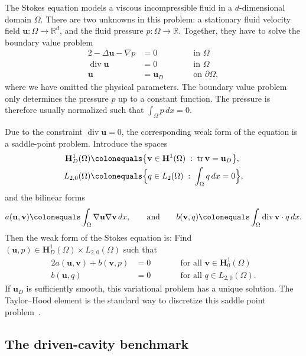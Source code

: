 \documentclass[a4paper,10pt,headings=normal,bibliography=totoc]{scrartcl}
\newcommand{\R}{\mathbb{R}}
\renewcommand{\div}{\operatorname{div}}
\begin{document}
The Stokes equation models a viscous incompressible
fluid in a $d$-dimensional domain $\Omega$.  There are two unknowns in this problem: a stationary
fluid velocity field $\mathbf{u} : \Omega \to \R^d$, and the fluid pressure $p : \Omega \to \R$.
Together, they have to solve the boundary value problem
\begin{alignat*}{2}
 -\Delta \mathbf{u} - \nabla p & = 0  & \qquad & \text{in $\Omega$} \\
 \div \mathbf{u} & = 0                &        & \text{in $\Omega$} \\
                    \mathbf{u} & = \mathbf{u}_D  &        & \text{on $\partial \Omega$},
\end{alignat*}
where we have omitted the physical parameters.  The boundary value problem only determines the
pressure $p$ up to a constant function.  The pressure is therefore usually normalized such
that $\int_\Omega p\,dx = 0$.

Due to the constraint $\div \mathbf{u} = 0$, the corresponding weak form of the equation is a saddle-point problem.
Introduce the spaces
\begin{align*}
 \mathbf{H}^1_D(\Omega)
      & \colonequals
      \big\{ \mathbf{v} \in \mathbf{H}^1(\Omega) \; :\; \operatorname{tr}{\mathbf{v}} = \mathbf{u}_D \big\}, \\
 L_{2,0}(\Omega) & \colonequals  \Big\{ q \in L_2(\Omega) \; :\; \int_\Omega q\,dx = 0 \Big\},
\end{align*}
and the bilinear forms
\begin{equation*}
 a(\mathbf{u},\mathbf{v}) \colonequals \int_\Omega \nabla \mathbf{u} \nabla \mathbf{v} \,dx,
 \qquad \text{and} \qquad
 b(\mathbf{v},q) \colonequals \int_\Omega \div \mathbf{v} \cdot q \,dx.
\end{equation*}
Then the weak form of the Stokes equation is: Find $(\mathbf{u},p) \in \mathbf{H}_D^1(\Omega) \times L_{2,0}(\Omega)$ such that
\begin{alignat*}{2}
 a(\mathbf{u},\mathbf{v}) + b(\mathbf{v},p) & = 0 & \qquad & \text{for all $\mathbf{v} \in \mathbf{H}_0^1(\Omega)$} \\
 b(\mathbf{u},q)\qquad\qquad & = 0       &        & \text{for all $q \in L_{2,0}(\Omega)$}.
\end{alignat*}
If $\mathbf{u}_D$ is sufficiently smooth, this variational problem has a unique solution.
The Taylor--Hood element is the standard way to discretize this saddle point problem~\cite{braess:2013}.

\subsection{The driven-cavity benchmark}
\end{document}
